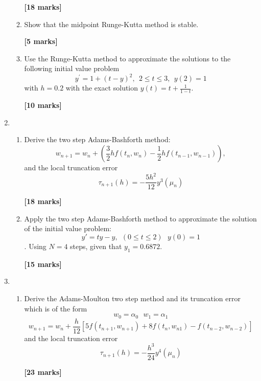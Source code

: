 \begin{enumerate}
\begin{enumerate}
\begin{flushright}
\textbf{[18 marks]}
\end{flushright}


\item 
Show that the midpoint Runge-Kutta method is stable.
\begin{flushright}
\textbf{[5 marks]}
\end{flushright}

\item
Use the Runge-Kutta method to approximate the solutions to the following initial
value problem
\[y^{'}=1+(t-y)^2, \ \ 2\leq t \leq 3, \ \ y(2)=1\]
with $h=0.2$ with the exact solution $y(t)=t +\frac{1}{1-t}$.
\begin{flushright}
\textbf{[10 marks]}
\end{flushright}

\end{enumerate}
\item
\begin{enumerate}
\item
Derive the two step Adams-Bashforth method:
\[ w_{n+1}=w_n+(\frac{3}{2}hf(t_{n},w_{n})-\frac{1}{2}hf(t_{n-1},w_{n-1})),\]
and the local truncation error
\[ \tau_{n+1}(h)=-\frac{5h^2}{12}y^{3}(\mu_n)\]
\begin{flushright}
\textbf{[18 marks]}
\end{flushright}

\item
Apply the two step Adams-Bashforth method to approximate the solution of the initial value problem:
\[ y'=ty-y, \ \ (0\leq t \leq 2) \ \ \ y(0)=1\].
Using $N=4$ steps, given that $y_1=0.6872$.
\begin{flushright}
\textbf{[15 marks]}
\end{flushright}

\end{enumerate}

\item
\begin{enumerate}
\item
Derive the Adams-Moulton two step method and its truncation error which is of the form
\[w_0=\alpha_0 \ \ \ w_1=\alpha_1 \]
\[w_{n+1}=w_n + \frac{h}{12}[5f(t_{n+1},w_{n+1})+8f(t_{n},w_{n1})-f(t_{n-2},w_{n-2})] \]
and the local truncation error
\[ \tau_{n+1}(h)=-\frac{h^3}{24}y^{4}(\mu_n)\]

\begin{flushright}
\textbf{[23 marks]}
\end{flushright}


\end{enumerate}
\end{enumerate}
